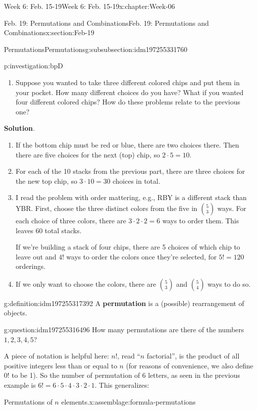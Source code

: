 \documentclass[oneside,10pt,]{book}
\newcommand{\blocktitlefont}{\relax}
\newcommand{\terminology}[1]{\textbf{#1}}
\numberwithin{equation}{section}
\begin{document}
\begin{chapterptx}{Week 6: Feb. 15-19}{}{Week 6: Feb. 15-19}{}{}{x:chapter:Week-06}
\begin{sectionptx}{Feb. 19: Permutations and Combinations}{}{Feb. 19: Permutations and Combinations}{}{}{x:section:Feb-19}
\begin{subsubsectionptx}{Permutations}{}{Permutations}{}{}{g:subsubsection:idm197255331760}
\begin{investigation}{}{p:investigation:bpD}
\begin{enumerate}
\item{}Suppose you wanted to take three different colored chips and put them in your pocket. How many different choices do you have? What if you wanted four different colored chips? How do these problems relate to the previous one?%
\end{enumerate}
%
\par\smallskip%
\noindent\textbf{\blocktitlefont Solution}.\hypertarget{g:solution:idm197255323280}{}\quad{}%
\begin{enumerate}
\item{}If the bottom chip must be red or blue, there are two choices there. Then there are five choices for the next (top) chip, so \(2\cdot 5 = 10\).%
\item{}For each of the 10 stacks from the previous part, there are three choices for the new top chip, so \(3\cdot 10 = 30\) choices in total.%
\item{}I read the problem with order mattering, e.g., RBY is a different stack than YBR. First, choose the three distinct colors from the five in \(\binom{5}{3}\) ways. For each choice of three colors, there are \(3\cdot 2\cdot 2 = 6\) ways to order them. This leaves 60 total stacks.%
\par
If we're building a stack of four chips, there are 5 choices of which chip to leave out and \(4!\) ways to order the colors once they're selected, for \(5! = 120\) orderings.%
\item{}If we only want to choose the colors, there are \(\binom{5}{3}\) and \(\binom{5}{4}\) ways to do so.%
\end{enumerate}
\end{investigation}%
\begin{definition}{}{g:definition:idm197255317392}%
A \terminology{permutation} is a (possible) rearrangement of objects.%
\end{definition}
\begin{question}{}{g:question:idm197255316496}%
How many permutations are there of the numbers \(1,2,3,4,5\)?%
\end{question}
A piece of notation is helpful here: \(n!\), read ``\(n\) factorial'',  is the product of all positive integers less than or equal to \(n\) (for reasons of convenience, we also define 0! to be 1). So the number of permutation of 6 letters, as seen in the previous example is \(6! = 6\cdot 5 \cdot 4 \cdot 3 \cdot 2 \cdot 1\). This generalizes:%
\begin{assemblage}{Permutations of \(n\) elements.}{x:assemblage:formula-permutations}%

\end{assemblage}
\end{subsubsectionptx}
\end{sectionptx}
\end{chapterptx}
\end{document}
